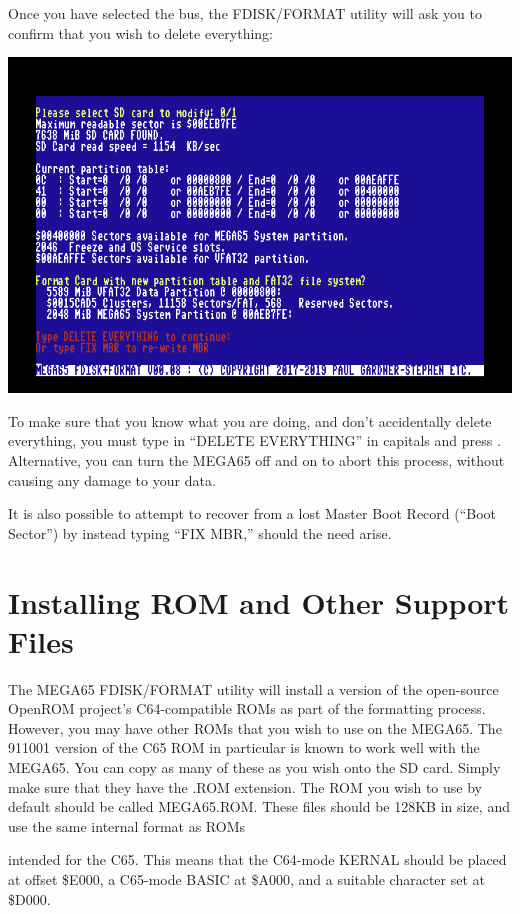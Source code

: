 Once you have selected the bus, the FDISK/FORMAT utility will ask you
to confirm that you wish to delete everything:

\includegraphics[width=\linewidth]{images/ss-m65fdisk-typesomething.png}

To make sure that you
know what you are doing, and don't accidentally delete everything, you
must type in ``DELETE EVERYTHING'' in capitals and press
.  Alternative, you can turn the MEGA65 off and on to
abort this process, without causing any damage to your data.

It is also possible to attempt to recover from a lost Master Boot
Record (``Boot Sector'') by instead typing ``FIX MBR,'' should the
need arise.

\section{Installing ROM and Other Support Files}

The MEGA65 FDISK/FORMAT utility will install a version of the
open-source OpenROM project's C64-compatible ROMs as part of the
formatting process. However, you may have other ROMs that you wish to
use on the MEGA65. The 911001 version of the C65 ROM in
particular is known to work well with the MEGA65.
You can copy as many of these as you wish onto the
SD card.  Simply make sure that they have the .ROM extension.  The ROM
you wish to use by default should be called MEGA65.ROM.  These files
should be 128KB in size, and use the same internal format as ROMs

intended for the C65.  This means that the C64-mode KERNAL should be
placed at offset \$E000, a C65-mode BASIC at \$A000, and a suitable
character set at \$D000.  

